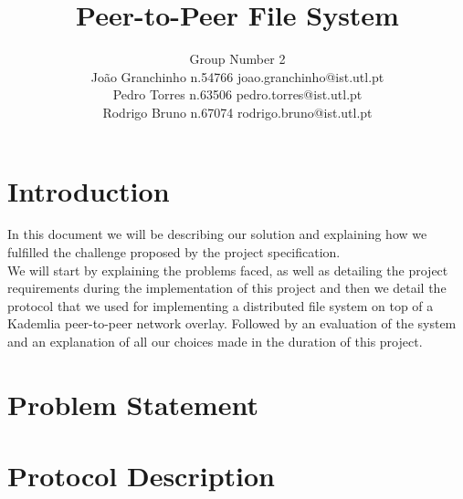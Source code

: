 \documentclass[times,9pt,article]{llncs}
\begin{document}
\title{Peer-to-Peer File System}

\author{Group Number 2 \\
Jo\~ao Granchinho n.54766 joao.granchinho@ist.utl.pt \\
Pedro Torres  n.63506 pedro.torres@ist.utl.pt \\
Rodrigo Bruno n.67074 rodrigo.bruno@ist.utl.pt}
\maketitle


\section{Introduction}
In this document we will be describing our solution and explaining how we fulfilled the challenge proposed by the project specification.\\
We will start by explaining the problems faced, as well as detailing the project requirements during the implementation of this project and then we detail the protocol that we used for implementing a distributed
file system on top of a Kademlia peer-to-peer network overlay. Followed by an evaluation of the system and an explanation of all our choices made in the duration of this project.


\section{Problem Statement}

\section{Protocol Description}
\end{document}
